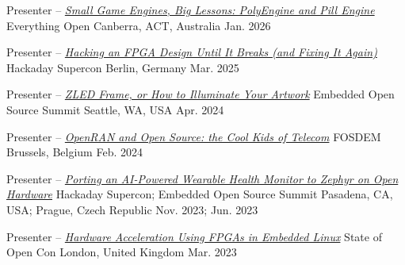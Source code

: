 
\begin{cventries}

  \cventry
    {Presenter -- \href{https://2026.everythingopen.au/schedule/presentation/16/}{\textit{Small Game Engines, Big Lessons: PolyEngine and Pill Engine}}}
    {Everything Open}
    {Canberra, ACT, Australia}
    {Jan. 2026}
    {}

  \cventry
  {Presenter -- \href{https://github.com/JDuchniewicz/Talks/blob/master/HackadayBerlin2025/hackingFPGA.pdf}{\textit{Hacking an FPGA Design Until It Breaks (and Fixing It Again)}}}
    {Hackaday Supercon}
    {Berlin, Germany}
    {Mar. 2025}
    {}

  \cventry
    {Presenter -- \href{https://www.youtube.com/watch?v=GVDdmtgtVxw}{\textit{ZLED Frame, or How to Illuminate Your Artwork}}}
    {Embedded Open Source Summit}
    {Seattle, WA, USA}
    {Apr. 2024}
    {}

  \cventry
    {Presenter -- \href{https://archive.fosdem.org/2024/schedule/event/fosdem-2024-3128-openran-open-source-the-cool-kids-of-telecom-shaking-up-5g-lte-networks/}{\textit{OpenRAN and Open Source: the Cool Kids of Telecom}}}
    {FOSDEM}
    {Brussels, Belgium}
    {Feb. 2024}
    {}

  \cventry
    {Presenter -- \href{https://www.youtube.com/watch?v=fBMeNOOghD4}{\textit{Porting an AI-Powered Wearable Health Monitor to Zephyr on Open Hardware}}}
    {Hackaday Supercon; Embedded Open Source Summit}
    {Pasadena, CA, USA; Prague, Czech Republic}
    {Nov. 2023; Jun. 2023}
    {}

  \cventry
    {Presenter -- \href{https://stateofopencon.com/2023/01/12/jakub-duchniewicz-speaker/}{\textit{Hardware Acceleration Using FPGAs in Embedded Linux}}}
    {State of Open Con}
    {London, United Kingdom}
    {Mar. 2023}
    {}

\end{cventries}
